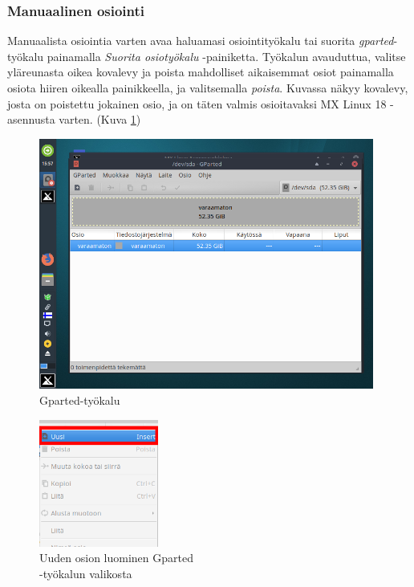 \documentclass[a4paper, 12pt, finnish]{article}
\begin{document}
\subsubsection{Manuaalinen osiointi}
\label{sec:manual}
Manuaalista osiointia varten avaa haluamasi osiointityökalu tai suorita \textit{gparted}-työkalu painamalla \textit{Suorita osiotyökalu} -painiketta. Työkalun avauduttua, valitse yläreunasta oikea kovalevy ja poista mahdolliset aikaisemmat osiot painamalla osiota hiiren oikealla painikkeella, ja valitsemalla \textit{poista}. Kuvassa näkyy kovalevy, josta on poistettu jokainen osio, ja on täten valmis osioitavaksi MX Linux 18 -asennusta varten. (Kuva \ref{fig:varaamaton})
\clearpage
\begin{figure}[htpb]
    \begin{center}
        \includegraphics[width=0.98\textwidth]{asen/osiointi_gparted}
        \caption{Gparted-työkalu}
        \label{fig:varaamaton}
    \end{center}
\end{figure}
\begin{figure}
  \begin{center}
    \includegraphics[width=0.35\textwidth]{asen/osiointi_gparted_uusi}
  \end{center}
  \vspace*{-3mm}
  \caption{Uuden osion luominen Gparted\\-työkalun valikosta}
  \label{fig:uusi}
\end{figure}
\end{document}
